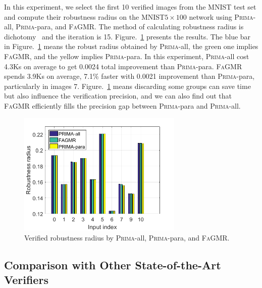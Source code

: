 \documentclass[runningheads]{llncs}
\newcommand{\ourtool}{\textsc{FaGMR}\xspace}
\newcommand{\prima}{\textsc{Prima}\xspace}
\newcommand{\mnist}{MNIST\xspace}
\begin{document}
In this experiment, we select the first 10 verified images from the \mnist test set
and compute their robustness radius on the \mnist $5\times100$ network using
\prima-all, \prima-para, and \ourtool.
The method of calculating robustness radius is dichotomy~\cite{DBLP:conf/cav/KatzBDJK17} and the iteration is 15.
Figure.~\ref{table2} presents the results.
The blue bar in Figure.~\ref{table2} means the robust radius obtained
by \prima-all, the green one implies \ourtool,
and the yellow implies \prima-para.
In this experiment, \prima-all cost 4.3Ks on average to get
0.0024 total improvement than \prima-para.
\ourtool spends 3.9Ks on average, 7.1\% faster with 0.0021 improvement
than \prima-para, particularly in images 7.
Figure.~\ref{table2} means discarding some groups
 can save time but also influence the verification precision,
and we can also find out that \ourtool efficiently fills the precision gap between
\prima-para and \prima-all.
\begin{figure}
	\begin{center}
	\includegraphics[width=0.7\textwidth]{figures/FigR3_2.png}
	\caption{Verified robustness radius by \prima-all, \prima-para, and \ourtool.} \label{table2}
	\end{center}
\end{figure}
%
%
%


\subsection{Comparison with Other State-of-the-Art Verifiers}\label{Sec5.4}
\end{document}
